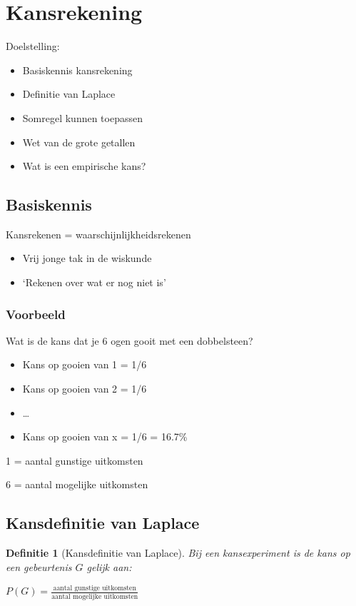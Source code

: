 \documentclass{article}
\newtheorem{theorem}{Definitie}[section]
\begin{document}
\section{Kansrekening}

Doelstelling: 

\begin{itemize}
    \item Basiskennis kansrekening
    \item Definitie van Laplace
    \item Somregel kunnen toepassen
    \item Wet van de grote getallen
    \item Wat is een empirische kans?
\end{itemize}

\subsection{Basiskennis}

Kansrekenen = waarschijnlijkheidsrekenen

\begin{itemize}
    \item Vrij jonge tak in de wiskunde
    \item `Rekenen over wat er nog niet is'
\end{itemize}

\subsubsection{Voorbeeld}

Wat is de kans dat je 6 ogen gooit met een dobbelsteen?

\begin{itemize}
    \item Kans op gooien van 1 = 1/6
    \item Kans op gooien van 2 = 1/6
    \item \dots
    \item Kans op gooien van x = 1/6 = 16.7\%
\end{itemize}

1 = aantal gunstige uitkomsten

6 = aantal mogelijke uitkomsten

\subsection{Kansdefinitie van Laplace}

\begin{theorem}[Kansdefinitie van Laplace]
Bij een kansexperiment is de kans op een gebeurtenis $G$ gelijk aan:

$P(G) = \frac{\text{aantal gunstige uitkomsten}}{\text{aantal mogelijke uitkomsten}}$



\end{theorem}
\end{document}
